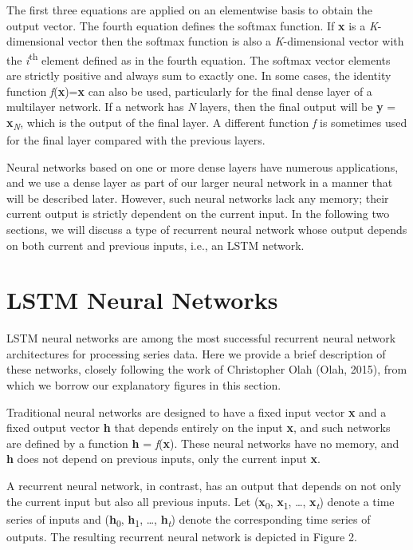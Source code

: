 \documentclass[
]{article}
\begin{document}
The first three equations are applied on an elementwise basis to obtain
the output vector. The fourth equation defines the softmax function. If
\textbf{x} is a \emph{K}-dimensional vector then the softmax function is
also a \emph{K}-dimensional vector with the \emph{i}\textsuperscript{th}
element defined as in the fourth equation. The softmax vector elements
are strictly positive and always sum to exactly one. In some cases, the
identity function \emph{f}(\textbf{x})=\textbf{x} can also be used,
particularly for the final dense layer of a multilayer network. If a
network has \emph{N} layers, then the final output will be \textbf{y} =
\textbf{x}\emph{\textsubscript{N}}, which is the output of the final
layer. A different function \emph{f} is sometimes used for the final
layer compared with the previous layers.

Neural networks based on one or more dense layers have numerous
applications, and we use a dense layer as part of our larger neural
network in a manner that will be described later. However, such neural
networks lack any memory; their current output is strictly dependent on
the current input. In the following two sections, we will discuss a type
of recurrent neural network whose output depends on both current and
previous inputs, i.e., an LSTM network.

\hypertarget{lstm-neural-networks}{%
\section{LSTM Neural Networks}\label{lstm-neural-networks}}

LSTM neural networks are among the most successful recurrent neural
network architectures for processing series data. Here we provide a
brief description of these networks, closely following the work of
Christopher Olah (Olah, 2015), from which we borrow our explanatory
figures in this section.

Traditional neural networks are designed to have a fixed input vector
\textbf{x} and a fixed output vector \textbf{h} that depends entirely on
the input \textbf{x}, and such networks are defined by a function
\textbf{h} = \emph{f}(\textbf{x}). These neural networks have no memory,
and \textbf{h} does not depend on previous inputs, only the current
input \textbf{x}.

A recurrent neural network, in contrast, has an output that depends on
not only the current input but also all previous inputs. Let
(\textbf{x}\textsubscript{0}, \textbf{x}\textsubscript{1}, \ldots,
\textbf{x}\emph{\textsubscript{t}}) denote a time series of inputs and
(\textbf{h}\textsubscript{0}, \textbf{h}\textsubscript{1}, \ldots,
\textbf{h}\emph{\textsubscript{t}}) denote the corresponding time series
of outputs. The resulting recurrent neural network is depicted in Figure
2.
\end{document}
